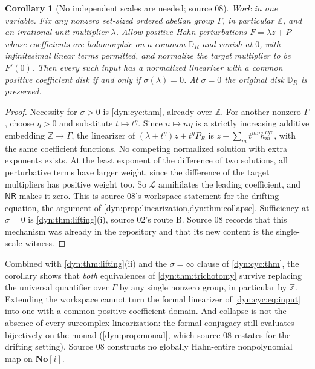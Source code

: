 \documentclass[11pt,letterpaper]{article}
\newtheorem{corollary}[corollary]{Corollary}
\theoremstyle{definition}
\theoremstyle{remark}
\newcommand{\Z}{\mathbb Z}
\newcommand{\No}{\mathbf{No}}
\newcommand{\Li}{\mathcal L}
\newcommand{\nres}{\mathsf{NR}}
\numberwithin{equation}{section}
\begin{document}
\begin{corollary}[No independent scales are needed; source 08]
\label{dyn:cyc:cor:classification}
Work in one variable. Fix any nonzero set-sized ordered abelian group
$\Gamma$, in particular $\Z$, and an irrational unit multiplier $\lambda$.
Allow positive Hahn perturbations $F=\lambda z+P$ whose coefficients are
holomorphic on a common $\mathbb D_R$ and vanish at $0$, with infinitesimal
linear terms permitted, and normalize the target multiplier to be $F'(0)$.
Then every such input has a normalized linearizer with a common positive
coefficient disk \emph{if and only if} $\sigma(\lambda)=0$. At
$\sigma=0$ the original disk $\mathbb D_R$ is preserved.
\end{corollary}
\begin{proof}
Necessity for $\sigma>0$ is \cref{dyn:cyc:thm}, already over $\Z$. For
another nonzero $\Gamma$, choose $\eta>0$ and substitute $t\mapsto t^{\eta}$.
Since $n\mapsto n\eta$ is a strictly increasing additive embedding
$\Z\to\Gamma$, the linearizer of $(\lambda+t^{\eta})z+t^{\eta}P_R$ is
$z+\sum_mt^{m\eta}h^{\mathrm{cyc}}_m$, with the same coefficient functions.
No competing normalized solution with extra exponents exists. At the least
exponent of the difference of two solutions, all perturbative terms have
larger weight, since the difference of the target multipliers has positive
weight too. So $\Li$ annihilates the leading coefficient, and $\nres$ makes
it zero. This is source 08's workspace statement for the drifting equation,
the argument of \cref{dyn:prop:linearization,dyn:thm:collapse}. Sufficiency
at $\sigma=0$ is \cref{dyn:thm:lifting}(i), source 02's route B. Source 08
records that this mechanism was already in the repository and that its new
content is the single-scale witness.
\end{proof}

Combined with \cref{dyn:thm:lifting}(ii) and the $\sigma=\infty$ clause of
\cref{dyn:cyc:thm}, the corollary shows that \emph{both} equivalences of
\cref{dyn:thm:trichotomy} survive replacing the universal quantifier over
$\Gamma$ by any single nonzero group, in particular by $\Z$. Extending the
workspace cannot turn the formal linearizer of \eqref{dyn:cyc:eq:input} into
one with a common positive coefficient domain. And collapse is not the
absence of every surcomplex linearization: the formal conjugacy still
evaluates bijectively on the monad (\cref{dyn:prop:monad}, which source 08
restates for the drifting setting). Source 08 constructs no globally
Hahn-entire nonpolynomial map on $\No[i]$.
\end{document}
